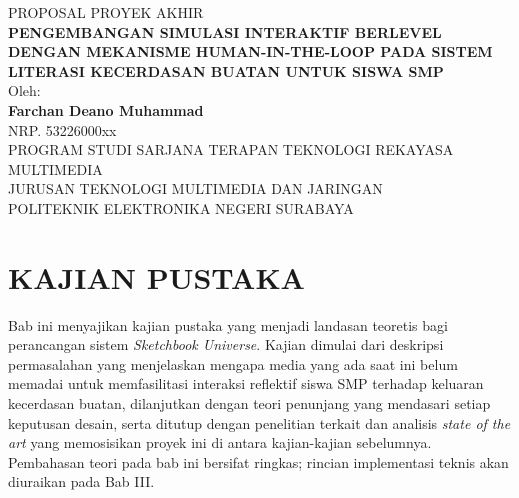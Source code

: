\documentclass[12pt,a4paper,oneside,openany]{report}
\begin{document}

\begin{titlepage}
\centering
\vspace*{2cm}
{\fontsize{14pt}{16pt}\selectfont PROPOSAL PROYEK AKHIR}\\[1cm]
{\fontsize{14pt}{18pt}\selectfont\bfseries\MakeUppercase{Pengembangan Simulasi Interaktif Berlevel dengan Mekanisme Human-in-the-Loop pada Sistem Literasi Kecerdasan Buatan untuk Siswa SMP}}\\[2cm]
{\fontsize{12pt}{14pt}\selectfont Oleh:}\\[0.3cm]
{\fontsize{12pt}{14pt}\selectfont\bfseries Farchan Deano Muhammad}\\[0.2cm]
{\fontsize{12pt}{14pt}\selectfont NRP. 53226000xx}\\[2cm]
{\fontsize{12pt}{14pt}\selectfont PROGRAM STUDI SARJANA TERAPAN TEKNOLOGI REKAYASA MULTIMEDIA}\\[0.2cm]
{\fontsize{12pt}{14pt}\selectfont JURUSAN TEKNOLOGI MULTIMEDIA DAN JARINGAN}\\[0.2cm]
{\fontsize{12pt}{14pt}\selectfont POLITEKNIK ELEKTRONIKA NEGERI SURABAYA}\\[0.2cm]
{\fontsize{12pt}{14pt}}
\end{titlepage}

\chapter{KAJIAN PUSTAKA}
\label{chap:bab2}

Bab ini menyajikan kajian pustaka yang menjadi landasan teoretis bagi perancangan sistem \textit{Sketchbook Universe}. Kajian dimulai dari deskripsi permasalahan yang menjelaskan mengapa media yang ada saat ini belum memadai untuk memfasilitasi interaksi reflektif siswa SMP terhadap keluaran kecerdasan buatan, dilanjutkan dengan teori penunjang yang mendasari setiap keputusan desain, serta ditutup dengan penelitian terkait dan analisis \textit{state of the art} yang memosisikan proyek ini di antara kajian-kajian sebelumnya. Pembahasan teori pada bab ini bersifat ringkas; rincian implementasi teknis akan diuraikan pada Bab III.
\end{document}
